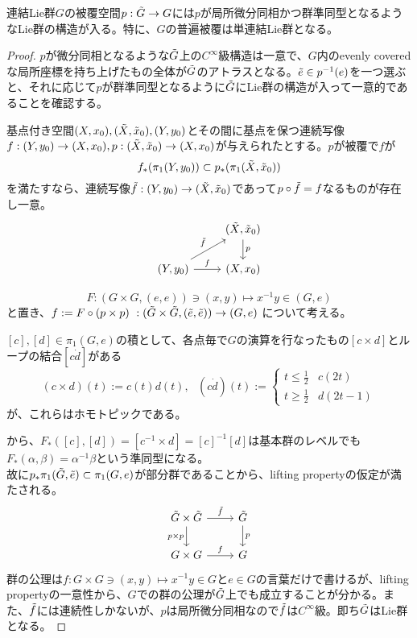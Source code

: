 \begin{prop}
    連結Lie群$G$の被覆空間$p:\Tilde{G}\to G$には$p$が局所微分同相かつ群準同型となるようなLie群の構造が入る。特に、$G$の普遍被覆は単連結Lie群となる。
\end{prop}
\begin{proof}
    $p$が微分同相となるような$\Tilde{G}$上の$C^\infty$級構造は一意で、$G$内のevenly coveredな局所座標を持ち上げたもの全体が$\Tilde{G}$のアトラスとなる。$\Tilde{e}\in p^{-1}(e)$を一つ選ぶと、それに応じて$p$が群準同型となるように$\Tilde{G}$にLie群の構造が入って一意的であることを確認する。
    \begin{fact}
        基点付き空間$(X,x_0),(\Tilde{X},\Tilde{x}_0),(Y,y_0)$とその間に基点を保つ連続写像$f:(Y,y_0)\to(X,x_0),p:(\Tilde{X},\Tilde{x}_0)\to(X,x_0)$が与えられたとする。$p$が被覆で$f$が
        \[f_*(\pi_1(Y,y_0))\subset p_*(\pi_1(\Tilde{X},\Tilde{x}_0))\]
        を満たすなら、連続写像$\Tilde{f}:(Y,y_0)\to(\Tilde{X},\Tilde{x}_0)$であって$p\circ\Tilde{f}=f$なるものが存在し一意。
        \[\begin{tikzcd}
            & (\Tilde{X},\Tilde{x}_0)\arrow[d,"p"]\\
            (Y,y_0)\arrow[ru,"\Tilde{f}"]\arrow[r,"f"] & (X,x_0)
        \end{tikzcd}\]
    \end{fact}
    \[F:(G\times G,(e,e))\ni (x,y)\longmapsto x^{-1}y\in (G,e)\]
    と置き、$f:=F\circ(p\times p)\ :(\Tilde{G}\times\Tilde{G},(\Tilde{e},\Tilde{e}))\to(G,e)$ について考える。
    \begin{fact}[位相群の基本群は可換]
        $[c],[d]\in\pi_1(G,e)$の積として、各点毎で$G$の演算を行なったもの$[c\times d]$とループの結合$[c\dot d]$がある
        \[(c\times d)(t):=c(t)d(t),\ \ \ (c\dot d)(t):=\begin{cases}
            t\leq\frac12 & c(2t)\\
            t\geq\frac12 & d(2t-1)
        \end{cases}\]
        が、これらはホモトピックである。
    \end{fact}
    から、$F_*([c],[d])=[c^{-1}\times d]=[c]^{-1}[d]$は基本群のレベルでも$F_*(\alpha,\beta)=\alpha^{-1}\beta$という準同型になる。\\
    故に$p_*\pi_1(\Tilde{G},\Tilde{e})\subset\pi_1(G,e)$が部分群であることから、lifting propertyの仮定が満たされる。
    \[\begin{tikzcd}
        \Tilde{G}\times\Tilde{G}\arrow[r,"\Tilde{f}"]\arrow[d,"p\times p"'] &\Tilde{G}\arrow[d,"p"]\\
        G\times G\arrow[r,"f"] & G
    \end{tikzcd}\]
    群の公理は$f:G\times G\ni(x,y)\mapsto x^{-1}y\in G$と$e\in G$の言葉だけで書けるが、lifting propertyの一意性から、$G$での群の公理が$\Tilde{G}$上でも成立することが分かる。また、$\Tilde{f}$には連続性しかないが、$p$は局所微分同相なので$\Tilde{f}$は$C^\infty$級。即ち$\Tilde{G}$はLie群となる。
\end{proof}
